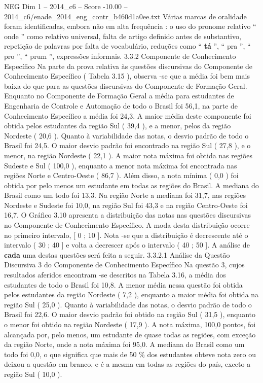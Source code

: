 \begin{textsample}{NEG Dim 1 – 2014\_c6 – Score -10.00 – 2014\_c6/enade\_2014\_eng\_contr\_b460d1a0ee.txt}
Várias marcas de oralidade foram identificadas, embora não em alta frequência : o uso do pronome relativo “ onde ” como relativo universal, falta de artigo definido antes de substantivo, repetição de palavras por falta de vocabulário, reduções como “ \textbf{tá} ”, “ pra ”, “ pro ”, “ prum ”, expressões informais. 3.3.2 Componente de Conhecimento Específico Na parte da prova relativa às questões discursivas do Componente de Conhecimento Específico ( Tabela 3.15 ), observa -se que a média foi bem mais baixa do que para as questões discursivas do Componente de Formação Geral.
Enquanto no Componente de Formação Geral a média para estudantes de Engenharia de Controle e Automação de todo o Brasil foi 56,1, na parte de Conhecimento Específico a média foi 24,3.
A maior média deste componente foi obtida pelos estudantes da região Sul ( 39,4 ), e a menor, pelos da região Nordeste ( 20,6 ).
Quanto à variabilidade das notas, o desvio padrão de todo o Brasil foi 24,5.
O maior desvio padrão foi encontrado na região Sul ( 27,8 ), e o menor, na região Nordeste ( 22,1 ).
A maior nota máxima foi obtida nas regiões Sudeste e Sul ( 100,0 ), enquanto a menor nota máxima foi encontrada nas regiões Norte e Centro-Oeste ( 86,7 ).
Além disso, a nota mínima ( 0,0 ) foi obtida por pelo menos um estudante em todas as regiões do Brasil.
A mediana do Brasil como um todo foi 13,3.
Na região Norte a mediana foi 31,7, nas regiões Nordeste e Sudeste foi 10,0, na região Sul foi 43,3 e na região Centro-Oeste foi 16,7.
O Gráfico 3.10 apresenta a distribuição das notas nas questões discursivas no Componente de Conhecimento Específico.
A moda desta distribuição ocorre no primeiro intervalo, [ 0 ; 10 ].
Nota -se que a distribuição é decrescente até o intervalo ( 30 ; 40 ] e volta a decrescer após o intervalo ( 40 ; 50 ].
A análise de \textbf{cada} uma destas questões será feita a seguir. 3.3.2.1 Análise da Questão Discursiva 3 do Componente de Conhecimento Específico Na questão 3, cujos resultados aferidos encontram -se descritos na Tabela 3.16, a média dos estudantes de todo o Brasil foi 10,8.
A menor média nessa questão foi obtida pelos estudantes da região Nordeste ( 7,2 ), enquanto a maior média foi obtida na região Sul ( 25,0 ).
Quanto à variabilidade das notas, o desvio padrão de todo o Brasil foi 22,6.
O maior desvio padrão foi obtido na região Sul ( 31,5 ), enquanto o menor foi obtido na região Nordeste ( 17,9 ).
A nota máxima, 100,0 pontos, foi alcançada por, pelo menos, um estudante de quase todas as regiões, com exceção da região Norte, onde a nota máxima foi 95,0.
A mediana do Brasil como um todo foi 0,0, o que significa que mais de 50 \% dos estudantes obteve nota zero ou deixou a questão em branco, e é a mesma em todas as regiões do país, exceto a região Sul ( 10,0 ).

\end{textsample}
